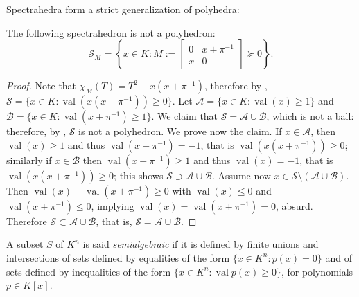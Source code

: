 \documentclass{elsarticle}
\theoremstyle{plain}
\theoremstyle{definition}
\DeclareMathOperator{\val}{val}
\begin{document}
Spectrahedra form a strict generalization of polyhedra:

\begin{example}
  The following spectrahedron is not a polyhedron:
  \[
  \mathcal{S}_M = \left\{x \in K : M := \begin{bmatrix} 0 & x + \pi^{-1} \\ x & 0 \end{bmatrix} \succeq 0\right\}.
  \] 
\end{example}
\begin{proof}
  Note that
  $\chi_M(T) = T^2-x(x+\pi^{-1})$, therefore by ,
  $\mathcal{S} = \{x \in K : \val(x(x + \pi^{-1})) \geq 0\}$.
  Let $\mathcal{A} = \{x \in K : \val(x) \geq 1\}$ and
  $\mathcal{B} = \{x \in K : \val(x+\pi^{-1}) \geq 1\}$.
  We claim that $\mathcal{S} = \mathcal{A} \cup \mathcal{B}$, which is not
  a ball: therefore, by , $\mathcal{S}$ is not a polyhedron.
  We prove now the claim. If $x \in \mathcal{A}$, then $\val(x)\geq 1$ and
  thus $\val(x+\pi^{-1})=-1$, that is $\val(x(x+\pi^{-1})) \geq 0$; similarly
  if $x \in \mathcal{B}$ then $\val(x+\pi^{-1}) \geq 1$ and thus $\val(x) = -1$,
  that is $\val(x(x+\pi^{-1})) \geq 0$; this shows $\mathcal{S} \supset \mathcal{A}
  \cup \mathcal{B}$. Assume now $x \in \mathcal{S} \setminus (\mathcal{A} \cup
  \mathcal{B})$. Then $\val(x)+\val(x+\pi^{-1}) \geq 0$ with $\val(x) \leq 0$
  and $\val(x+\pi^{-1}) \leq 0$, implying $\val(x) = \val(x+\pi^{-1}) = 0$, absurd.
  Therefore $\mathcal{S} \subset \mathcal{A} \cup \mathcal{B}$, that is,
  $\mathcal{S} = \mathcal{A} \cup \mathcal{B}$.
\end{proof}

\begin{definition}
  A subset $S$ of $K^n$ is said \emph{semialgebraic} if it is defined by finite unions and intersections
  of sets defined by equalities of the form $\{x \in K^n  : p(x) = 0\}$
  and of sets defined by inequalities of the form $\{ x\in K^n : \val p(x) \geq 0\}$, for polynomials
  $p \in K[x]$.
\end{definition}
\end{document}
